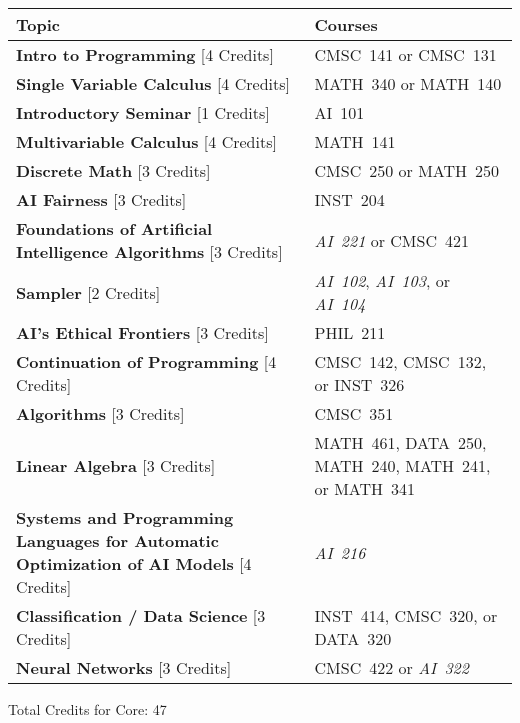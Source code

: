 \begin{longtable}{p{7cm}>{\raggedleft\arraybackslash}p{7cm}}
Topic & Courses \\
\toprule
\textbf{Intro to Programming} [4 Credits] & CMSC~141 or CMSC~131           \\
\textbf{Single Variable Calculus} [4 Credits] & MATH~340 or MATH~140       \\
\textbf{Introductory Seminar} [1 Credits] & AI~101                         \\
\textbf{Multivariable Calculus} [4 Credits] & MATH~141                     \\
\textbf{Discrete Math} [3 Credits] & CMSC~250 or MATH~250                  \\
\textbf{AI Fairness} [3 Credits] & INST~204                                \\
\textbf{Foundations of Artificial Intelligence Algorithms} [3 Credits] & \textit{AI~221} or CMSC~421 \\
\textbf{Sampler} [2 Credits] & \textit{AI~102}, \textit{AI~103}, or \textit{AI~104} \\
\textbf{AI's Ethical Frontiers} [3 Credits] & PHIL~211                     \\
\textbf{Continuation of Programming} [4 Credits] & CMSC~142, CMSC~132, or INST~326 \\
\textbf{Algorithms} [3 Credits] & CMSC~351                                 \\
\textbf{Linear Algebra} [3 Credits] & MATH~461, DATA~250, MATH~240, MATH~241, or MATH~341 \\
\textbf{Systems and Programming Languages for Automatic Optimization of AI Models} [4 Credits] & \textit{AI~216} \\
\textbf{Classification / Data Science} [3 Credits] & INST~414, CMSC~320, or DATA~320 \\
\textbf{Neural Networks} [3 Credits] & CMSC~422 or \textit{AI~322}         \\
\bottomrule
\end{longtable}
Total Credits for Core: 47
